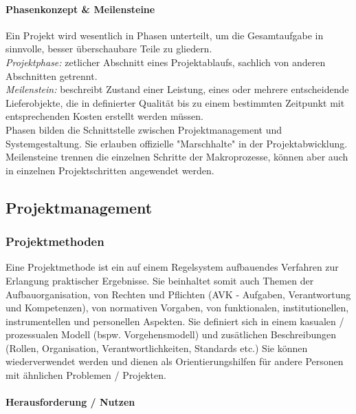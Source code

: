 \documentclass[a4paper]{article}
\begin{document}
			\paragraph{Phasenkonzept \& Meilensteine}
			
			Ein Projekt wird wesentlich in Phasen unterteilt, um die Gesamtaufgabe in sinnvolle, besser überschaubare Teile zu gliedern.\\
			\textit{Projektphase:} zetlicher Abschnitt eines Projektablaufs, sachlich von anderen Abschnitten getrennt.\\
			\textit{Meilenstein:} beschreibt Zustand einer Leistung, eines oder mehrere entscheidende Lieferobjekte, die in definierter Qualität bis zu einem bestimmten Zeitpunkt mit entsprechenden Kosten erstellt werden müssen.\\
			Phasen bilden die Schnittstelle zwischen Projektmanagement und Systemgestaltung.
			Sie erlauben offizielle "Marschhalte" in der Projektabwicklung.
			Meilensteine trennen die einzelnen Schritte der Makroprozesse, können aber auch in einzelnen Projektschritten angewendet werden. 
			
	\subsection{Projektmanagement}
	
		\subsubsection{Projektmethoden}
		
		Eine Projektmethode ist ein auf einem Regelsystem aufbauendes Verfahren zur Erlangung praktischer Ergebnisse.
		Sie beinhaltet somit auch Themen der Aufbauorganisation, von Rechten und Pflichten (AVK - Aufgaben, Verantwortung und Kompetenzen), von normativen Vorgaben, von funktionalen, institutionellen, instrumentellen und personellen Aspekten.
		Sie definiert sich in einem kasualen / prozessualen Modell (bspw. Vorgehensmodell) und zusätlichen Beschreibungen (Rollen, Organisation, Verantwortlichkeiten, Standards etc.)
		Sie können wiederverwendet werden und dienen als Orientierungshilfen für andere Personen mit ähnlichen Problemen / Projekten.
		
\newpage
		
			\paragraph{Herausforderung / Nutzen}
			
\end{document}
